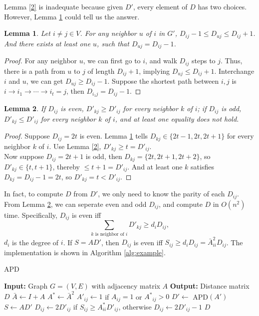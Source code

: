 \documentclass[12pt]{article}
\newtheorem{lemma}{Lemma}
\begin{document}
Lemma \ref{2} is inadequate because given $D'$, every element of $D$ has two choices. However, Lemma \ref{3} could tell us the answer.
\begin{lemma}
\label{3}
Let $i\not=j \in V$. For any neighbor $u$ of $i$ in $G'$, $D_{ij}-1\le D_{uj}\le D_{ij}+1$. And there exists at least one $u$, such that $D_{uj}=D_{ij}-1$.
\end{lemma}
\begin{proof}
For any neighbor $u$, we can first go to $i$, and walk $D_{ij}$ steps to $j$. Thus, there is a path from $u$ to $j$ of length $D_{ij}+1$, implying $D_{uj}\le D_{ij}+1$. Interchange $i$ and $u$, we can get $D_{uj}\ge D_{ij}-1$. Suppose the shortest path between $i,j$ is $i\to i_1\to\cdots\to i_t=j$, then $D_{i_1j}=D_{ij}-1$.
\end{proof}

\begin{lemma}
\label{4}
If $D_{ij}$ is even, $D'_{kj}\ge D'_{ij}$ for every neighbor $k$ of $i$; if $D_{ij}$ is odd, $D'_{kj}\le D'_{ij}$ for every neighbor $k$ of $i$, and at least one equality does not hold.
\end{lemma}
\begin{proof}
Suppose $D_{ij}=2t$ is even. Lemma \ref{3} tells $D_{kj}\in\{2t-1,2t,2t+1\}$ for every neighbor $k$ of $i$. Use Lemma \ref{2}, $D'_{kj}\ge t=D'_{ij}$. \\
Now suppose $D_{ij}=2t+1$ is odd, then $D_{kj}=\{2t,2t+1,2t+2\}$, so $D'_{kj}\in \{t,t+1\}$, thereby $\le t+1=D'_{ij}$. And at least one $k$ satisfies $D_{kj}=D_{ij}-1=2t$, so $D'_{kj}=t<D'_{ij}$.
\end{proof}

In fact, to compute $D$ from $D'$, we only need to know the parity of each $D_{ij}$. From Lemma \ref{4}, we can seperate even and odd $D_{ij}$, and compute $D$ in $O(n^2)$ time. Specifically, $D_{ij}$ is even iff
$$\sum\limits_{k\text{ is neighbor of }i} D'_{kj}\ge d_iD_{ij},$$
$d_i$ is the degree of $i$. If $S=AD'$, then $D_{ij}$ is even iff $S_{ij}\ge d_iD_{ij}=\bar A^2_{ii}D_{ij}$. The implementation is shown in Algorithm \ref{alg:example}.

\begin{algorithm}
\caption{APD}
\label{alg:example}
\begin{algorithmic}
    \STATE \textbf{Input:} Graph $G=(V,E)$ with adjacency matrix $A$
    \STATE \textbf{Output:} Distance matrix $D$
    \STATE $\bar A\leftarrow I+A$
    \STATE $A^*\leftarrow \bar A^2$
            \STATE $A'_{ij}\leftarrow 1$ if $A_{ij}=1$ or ${A^*}_{ij}>0$
        \ENDFOR
    \ENDFOR
    \STATE $D'\leftarrow$ APD$(A')$
    \STATE $S\leftarrow AD'$
            \STATE $D_{ij}\leftarrow 2D'_{ij}$ if $S_{ij}\ge A^*_{ii}D'_{ij}$, otherwise $D_{ij}\leftarrow 2D'_{ij}-1$
        \ENDFOR
    \ENDFOR
    \RETURN $D$
\end{algorithmic}
\end{algorithm}
\end{document}
